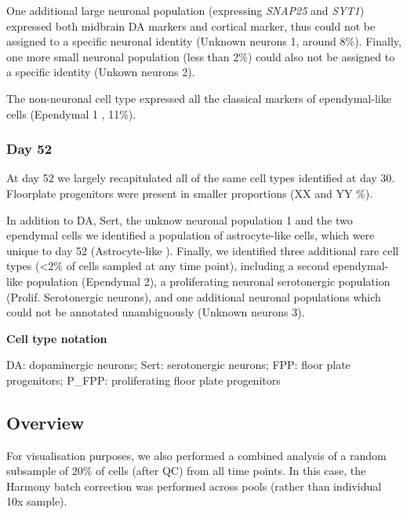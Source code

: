 One additional large neuronal population (expressing \textit{SNAP25} and \textit{SYT1}) expressed both midbrain DA markers and cortical marker, thus could not be assigned to a specific neuronal identity (Unknown neurons 1, around 8\%).
Finally, one more small neuronal population (less than 2\%) could also not be assigned to a specific identity (Unkown neurons 2). 

The non-neuronal cell type expressed all the classical markers of ependymal-like cells (Ependymal 1 \cite{campbell2017molecular}, 11\%). 

\subsubsection{Day 52}

At day 52 we largely recapitulated all of the same cell types identified at day 30.
Floorplate progenitors were present in smaller proportions (XX and YY \%).

In addition to DA, Sert, the unknow neuronal population 1 and the two ependymal cells we identified a population of astrocyte-like cells, which were unique to day 52 (Astrocyte-like \cite{sloan2017human, zhang2016purification}). 
Finally, we identified three additional rare cell types (<2\% of cells sampled at any time point), including a second ependymal-like population (Ependymal 2), a proliferating neuronal serotonergic population (Prolif. Serotonergic neurons), and one additional neuronal populations which could not be annotated unambiguously (Unknown neurons 3).

\begin{Abstract}
\textbf{Cell type notation}

DA: dopaminergic neurons;
Sert: serotonergic neurons;
FPP: floor plate progenitors;
P\_FPP: proliferating floor plate progenitors
\end{Abstract}

\subsection{Overview}

For visualisation purposes, we also performed a combined analysis of a random subsample of 20\% of cells (after QC) from all time points.
In this case, the Harmony batch correction was performed across pools (rather than individual 10x sample).

